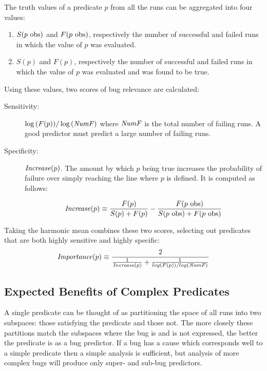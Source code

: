 The truth values of a predicate $p$ from all the runs can be aggregated into four values:

\begin{enumerate}
\item $S(\text{$p$ obs})$ and $F(\text{$p$ obs})$, respectively the number of successful and failed runs in which the value of $p$ was evaluated.
\item $S(p)$ and $F(p)$, respectively the number of successful and failed runs in which the value of $p$ was evaluated and was found to be true.
\end{enumerate}

Using these values, two scores of bug relevance are calculated:
\begin{description}
\item[Sensitivity:] $\log{(F(p))} / \log{(\mathit{NumF})}$ where $\mathit{NumF}$ is the total number of failing runs.  A good predictor must predict a large number of failing runs.
\item[Specificity:] $\mathit{Increase}(p)$.  The amount by which $p$ being true increases the probability of failure over simply reaching the line where $p$ is defined.  It is computed as follows:

  \begin{equation*}
    \label{eqn1}
    \mathit{Increase}(p) \equiv
    \frac{F(p)}{S(p) + F(p)}
    -
    \frac{F(\text{$p$ obs})}{S(\text{$p$ obs}) + F(\text{$p$ obs})}
  \end{equation*}

\end{description}

Taking the harmonic mean combines these two scores, selecting out predicates that are both highly sensitive and highly specific:
\begin{equation*}
\label{eqn2}
\Importance(p) \equiv
\frac{2}{%
  \frac{1}{\Increase(p)}
  +
  \frac{1}{log(F(p)) / log(\NumF)}}
\end{equation*}

\subsection{Expected Benefits of Complex Predicates}
A single predicate can be thought of as partitioning the space of all runs into two subspaces: those satisfying the predicate and those not.  The more closely these partitions match the subspaces where the bug is and is not expressed, the better the predicate is as a bug predictor.  If a bug has a cause which corresponds well to a simple predicate then a simple analysis is sufficient, but analysis of more complex bugs will produce only super- and sub-bug predictors.

